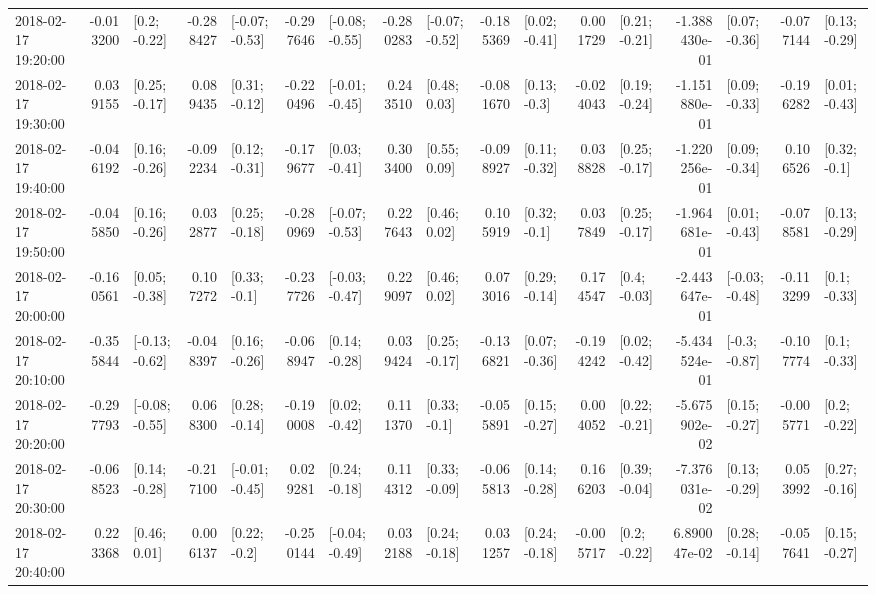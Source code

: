 \begin{tabular}{lrlrlrlrlrlrlrlrl}
2018-02-17 19:20:00 & -0.013200 &    [0.2; -0.22] & -0.288427 &  [-0.07; -0.53] & -0.297646 &  [-0.08; -0.55] & -0.280283 &  [-0.07; -0.52] & -0.185369 &   [0.02; -0.41] &  0.001729 &   [0.21; -0.21] & -1.388430e-01 &   [0.07; -0.36] & -0.077144 &   [0.13; -0.29] \\
2018-02-17 19:30:00 &  0.039155 &   [0.25; -0.17] &  0.089435 &   [0.31; -0.12] & -0.220496 &  [-0.01; -0.45] &  0.243510 &    [0.48; 0.03] & -0.081670 &    [0.13; -0.3] & -0.024043 &   [0.19; -0.24] & -1.151880e-01 &   [0.09; -0.33] & -0.196282 &   [0.01; -0.43] \\
2018-02-17 19:40:00 & -0.046192 &   [0.16; -0.26] & -0.092234 &   [0.12; -0.31] & -0.179677 &   [0.03; -0.41] &  0.303400 &    [0.55; 0.09] & -0.098927 &   [0.11; -0.32] &  0.038828 &   [0.25; -0.17] & -1.220256e-01 &   [0.09; -0.34] &  0.106526 &    [0.32; -0.1] \\
2018-02-17 19:50:00 & -0.045850 &   [0.16; -0.26] &  0.032877 &   [0.25; -0.18] & -0.280969 &  [-0.07; -0.53] &  0.227643 &    [0.46; 0.02] &  0.105919 &    [0.32; -0.1] &  0.037849 &   [0.25; -0.17] & -1.964681e-01 &   [0.01; -0.43] & -0.078581 &   [0.13; -0.29] \\
2018-02-17 20:00:00 & -0.160561 &   [0.05; -0.38] &  0.107272 &    [0.33; -0.1] & -0.237726 &  [-0.03; -0.47] &  0.229097 &    [0.46; 0.02] &  0.073016 &   [0.29; -0.14] &  0.174547 &    [0.4; -0.03] & -2.443647e-01 &  [-0.03; -0.48] & -0.113299 &    [0.1; -0.33] \\
2018-02-17 20:10:00 & -0.355844 &  [-0.13; -0.62] & -0.048397 &   [0.16; -0.26] & -0.068947 &   [0.14; -0.28] &  0.039424 &   [0.25; -0.17] & -0.136821 &   [0.07; -0.36] & -0.194242 &   [0.02; -0.42] & -5.434524e-01 &   [-0.3; -0.87] & -0.107774 &    [0.1; -0.33] \\
2018-02-17 20:20:00 & -0.297793 &  [-0.08; -0.55] &  0.068300 &   [0.28; -0.14] & -0.190008 &   [0.02; -0.42] &  0.111370 &    [0.33; -0.1] & -0.055891 &   [0.15; -0.27] &  0.004052 &   [0.22; -0.21] & -5.675902e-02 &   [0.15; -0.27] & -0.005771 &    [0.2; -0.22] \\
2018-02-17 20:30:00 & -0.068523 &   [0.14; -0.28] & -0.217100 &  [-0.01; -0.45] &  0.029281 &   [0.24; -0.18] &  0.114312 &   [0.33; -0.09] & -0.065813 &   [0.14; -0.28] &  0.166203 &   [0.39; -0.04] & -7.376031e-02 &   [0.13; -0.29] &  0.053992 &   [0.27; -0.16] \\
2018-02-17 20:40:00 &  0.223368 &    [0.46; 0.01] &  0.006137 &    [0.22; -0.2] & -0.250144 &  [-0.04; -0.49] &  0.032188 &   [0.24; -0.18] &  0.031257 &   [0.24; -0.18] & -0.005717 &    [0.2; -0.22] &  6.890047e-02 &   [0.28; -0.14] & -0.057641 &   [0.15; -0.27] \\

\end{tabular}

